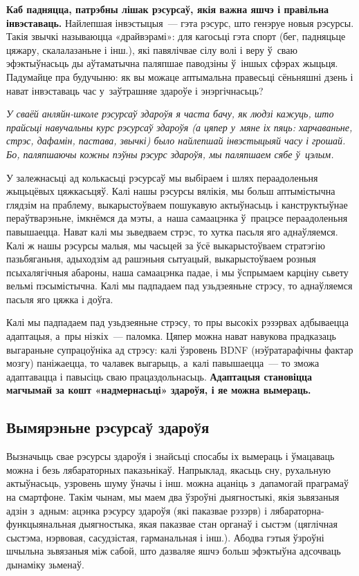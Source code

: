 \textbf{Каб падняцца, патрэбны лішак рэсурсаў, якія важна яшчэ і правільна інвэставаць.} Найлепшая інвэстыцыя~--- гэта рэсурс, што генэруе новыя рэсурсы. Такія звычкі называюцца «драйвэрамі»: для кагосьці гэта спорт (бег, падняцьце цяжару, скалалазаньне і інш.), які павялічвае сілу волі і веру ў~сваю эфэктыўнасьць ды аўтаматычна паляпшае паводзіны ў~іншых сфэрах жыцьця. Падумайце пра будучыню: як вы можаце аптымальна правесьці сёньняшні дзень і нават інвэставаць час у~заўтрашняе здароўе і энэргічнасьць?

\emph{У сваёй анляйн-школе рэсурсаў здароўя я часта бачу, як людзі кажуць, што прайсьці навучальны курс рэсурсаў здароўя (а цяпер у~мяне іх пяць: харчаваньне, стрэс, дафамін, пастава, звычкі) было найлепшай інвэстыцыяй часу і грошай. Бо, паляпшаючы кожны пэўны рэсурс здароўя, мы паляпшаем сябе ў~цэлым.}

У залежнасьці ад колькасьці рэсурсаў мы выбіраем і шлях пераадоленьня жыцьцёвых цяжкасьцяў. Калі нашы рэсурсы вялікія, мы больш аптымістычна глядзім на праблему, выкарыстоўваем пошукавую актыўнасьць і канструктыўнае пераўтварэньне, імкнёмся да мэты, а~наша самаацэнка ў~працэсе пераадоленьня павышаецца. Нават калі мы зьведваем стрэс, то хутка пасьля яго аднаўляемся. Калі ж нашы рэсурсы малыя, мы часьцей за ўсё выкарыстоўваем стратэгію пазьбяганьня, адыходзім ад рашэньня сытуацый, выкарыстоўваем розныя псыхалягічныя абароны, наша самаацэнка падае, і мы ўспрымаем карціну сьвету вельмі пэсымістычна. Калі мы падпадаем пад узьдзеяньне стрэсу, то аднаўляемся пасьля яго цяжка і доўга.

Калі мы падпадаем пад узьдзеяньне стрэсу, то пры высокіх рэзэрвах адбываецца адаптацыя, а~пры нізкіх~--- паломка. Цяпер можна нават навукова прадказаць выгараньне супрацоўніка ад стрэсу: калі ўзровень BDNF (нэўратарафічны фактар мозгу) паніжаецца, то чалавек выгарыць, а~калі павышаецца~--- то зможа адаптавацца і павысіць сваю працаздольнасьць. \textbf{Адаптацыя становіцца магчымай за кошт «надмернасьці» здароўя, і яе можна вымераць.}

\subsection*{Вымярэньне рэсурсаў здароўя}

Вызначыць свае рэсурсы здароўя і знайсьці спосабы іх вымераць і ўмацаваць можна і безь лябараторных паказьнікаў. Напрыклад, якасьць сну, рухальную актыўнасьць, узровень шуму ўначы і інш. можна ацаніць з~дапамогай праграмаў на смартфоне. Такім чынам, мы маем два ўзроўні дыягностыкі, якія зьвязаныя адзін з~адным: ацэнка рэсурсу здароўя (які паказвае рэзэрв) і лябараторна-функцыянальная дыягностыка, якая паказвае стан органаў і сыстэм (цяглічная сыстэма, нэрвовая, сасудзістая, гарманальная і інш.). Абодва гэтыя ўзроўні шчыльна зьвязаныя між сабой, што дазваляе яшчэ больш эфэктыўна адсочваць дынаміку зьменаў.

